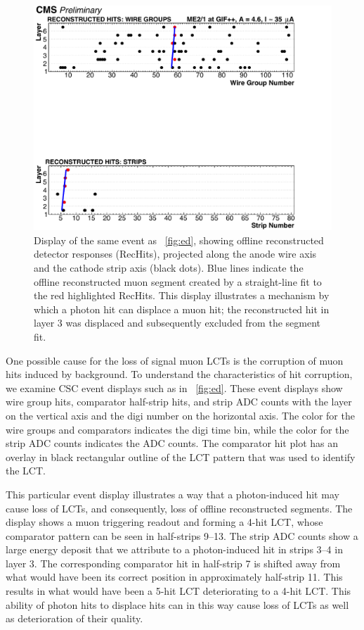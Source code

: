 \begin{figure}
	\centering
	\includegraphics[width=\dummyFigWidth]{figures/neutron/RH_GIF_3384_ME21_9.pdf}
  \caption[Display of the same event, showing offline reconstructed detector responses (RecHits).]{Display of the same event as \FigDot~\ref{fig:ed}, showing offline reconstructed detector responses (RecHits), projected along the anode wire axis and the cathode strip axis (black dots). Blue lines indicate the offline reconstructed muon segment created by a straight-line fit to the red highlighted RecHits. This display illustrates a mechanism by which a photon hit can displace a muon hit; the reconstructed hit in layer 3 was displaced and subsequently excluded from the segment fit.}
	\label{fig:rh}
\end{figure}

One possible cause for the loss of signal muon LCTs is the corruption of muon hits induced by background. To understand the characteristics of hit corruption, we examine CSC event displays such as in \FigDot~\ref{fig:ed}. These event displays show wire group hits, comparator half-strip hits, and strip ADC counts with the layer on the vertical axis and the digi number on the horizontal axis. The color for the wire groups and comparators indicates the digi time bin, while the color for the strip ADC counts indicates the ADC counts. The comparator hit plot has an overlay in black rectangular outline of the LCT pattern that was used to identify the LCT.

This particular event display illustrates a way that a photon-induced hit may cause loss of LCTs, and consequently, loss of offline reconstructed segments. The display shows a muon triggering readout and forming a 4-hit LCT, whose comparator pattern can be seen in half-strips 9--13. The strip ADC counts show a large energy deposit that we attribute to a photon-induced hit in strips 3--4 in layer 3. The corresponding comparator hit in half-strip 7 is shifted away from what would have been its correct position in approximately half-strip 11. This results in what would have been a 5-hit LCT deteriorating to a 4-hit LCT. This ability of photon hits to displace hits can in this way cause loss of LCTs as well as deterioration of their quality.

